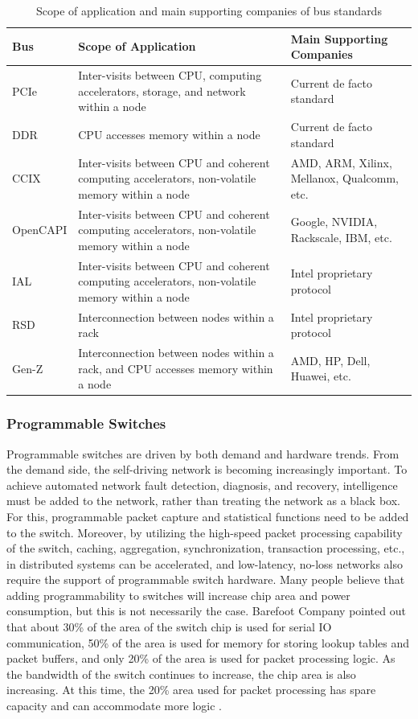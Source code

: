 \begin{table}[htbp]
	\centering
	\caption{Scope of application and main supporting companies of bus standards}
	\small
	\begin{tabular}{l|p{}|p{}}
		\hline
		Bus & Scope of Application & Main Supporting Companies \\
		\hline
		\hline
		PCIe & Inter-visits between CPU, computing accelerators, storage, and network within a node & Current de facto standard \\
		\hline
		DDR & CPU accesses memory within a node & Current de facto standard \\
		\hline
		CCIX & Inter-visits between CPU and coherent computing accelerators, non-volatile memory within a node & AMD, ARM, Xilinx, Mellanox, Qualcomm, etc. \\
		\hline
		OpenCAPI & Inter-visits between CPU and coherent computing accelerators, non-volatile memory within a node & Google, NVIDIA, Rackscale, IBM, etc. \\
		\hline
		IAL & Inter-visits between CPU and coherent computing accelerators, non-volatile memory within a node & Intel proprietary protocol \\
		\hline
		RSD & Interconnection between nodes within a rack & Intel proprietary protocol \\
		\hline
		Gen-Z & Interconnection between nodes within a rack, and CPU accesses memory within a node & AMD, HP, Dell, Huawei, etc. \\
		\hline
	\end{tabular}
	\label{background:tab:ccix-pcie}
\end{table}

\subsubsection{Programmable Switches}

Programmable switches are driven by both demand and hardware trends. From the demand side, the self-driving network is becoming increasingly important. To achieve automated network fault detection, diagnosis, and recovery, intelligence must be added to the network, rather than treating the network as a black box. For this, programmable packet capture and statistical functions need to be added to the switch. Moreover, by utilizing the high-speed packet processing capability of the switch, caching, aggregation, synchronization, transaction processing, etc., in distributed systems can be accelerated, and low-latency, no-loss networks also require the support of programmable switch hardware. Many people believe that adding programmability to switches will increase chip area and power consumption, but this is not necessarily the case. Barefoot Company pointed out that about 30\% of the area of the switch chip is used for serial IO communication, 50\% of the area is used for memory for storing lookup tables and packet buffers, and only 20\% of the area is used for packet processing logic. As the bandwidth of the switch continues to increase, the chip area is also increasing. At this time, the 20\% area used for packet processing has spare capacity and can accommodate more logic \cite{barefoot-programmable}.

